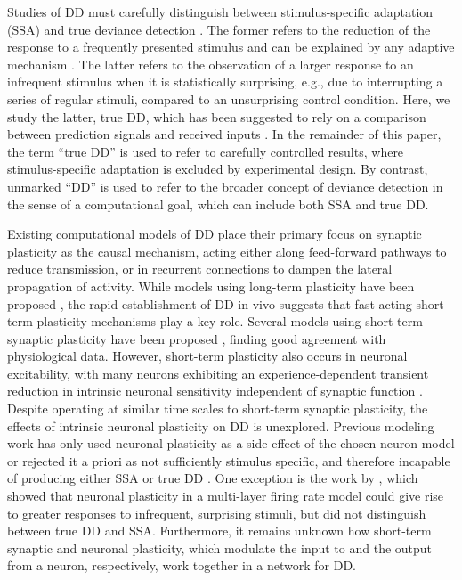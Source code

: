 \documentclass[9pt,lineno,onehalfspacing]{elife}
\begin{document}
Studies of DD must carefully distinguish between stimulus-specific adaptation (SSA) and true deviance detection \citep{Ross2020-qf}. The former refers to the reduction of the response to a frequently presented stimulus and can be explained by any adaptive mechanism \citep{May2010-qn, Garagnani2011-eu}. The latter refers to the observation of a larger response to an infrequent stimulus when it is statistically surprising, e.g., due to interrupting a series of regular stimuli, compared to an unsurprising control condition. Here, we study the latter, true DD, which has been suggested to rely on a comparison between prediction signals and received inputs \citep{Parras2017-fp, Carbajal2018-sd, Ross2020-qf}. In the remainder of this paper, the term ``true DD'' is used to refer to carefully controlled results, where stimulus-specific adaptation is excluded by experimental design. By contrast, unmarked ``DD'' is used to refer to the broader concept of deviance detection in the sense of a computational goal, which can include both SSA and true DD.

Existing computational models of DD place their primary focus on synaptic plasticity as the causal mechanism, acting either along feed-forward pathways to reduce transmission, or in recurrent connections to dampen the lateral propagation of activity. While models using long-term plasticity have been proposed \citep{Wacongne2012-ah, Hertag2020-kc}, the rapid establishment of DD in vivo \citep{Taaseh2011-gg} suggests that fast-acting short-term plasticity mechanisms play a key role. Several models using short-term synaptic plasticity have been proposed \citep{Mill2011-ah, May2015-lt, Yarden2017-eh}, finding good agreement with physiological data. However, short-term plasticity also occurs in neuronal excitability, with many neurons exhibiting an experience-dependent transient reduction in intrinsic neuronal sensitivity independent of synaptic function \citep{Sanchez-Vives2000-df, Henze2001-xd, Sanchez-Aguilera2014-fd}. Despite operating at similar time scales to short-term synaptic plasticity, the effects of intrinsic neuronal plasticity on DD is unexplored.  Previous modeling work has only used neuronal plasticity as a side effect of the chosen neuron model \citep{Mill2011-ah} or rejected it a priori as not sufficiently stimulus specific, and therefore incapable of producing either SSA or true DD \citep{Yarden2017-eh}. One exception is the work by \cite{Garagnani2011-eu}, which showed that neuronal plasticity in a multi-layer firing rate model could give rise to greater responses to infrequent, surprising stimuli, but did not distinguish between true DD and SSA. Furthermore, it remains unknown how short-term synaptic and neuronal plasticity, which modulate the input to and the output from a neuron, respectively, work together in a network for DD.
\end{document}
